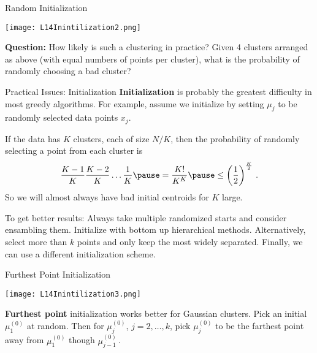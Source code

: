 \documentclass[10pt, table, dvipsnames,xcdraw,handout]{beamer}
\begin{document}
\begin{frame}[fragile]{Random Initialization}
  \begin{minipage}[t][0.5\textheight][t]{\textwidth}
	\centering \texttt{[image: L14Inintilization2.png]} 
  \end{minipage}
  \vfill
\begin{minipage}[t][0.5\textheight][t]{\textwidth}
\textbf{Question:} How likely is such a clustering in practice? Given 4 clusters arranged as above (with equal numbers of points per cluster), what is the probability of randomly choosing a bad cluster?
\end{minipage}
\end{frame}









\begin{frame}[fragile]{Practical Issues: Initialization}
\textbf{Initialization} is probably the greatest difficulty in most greedy algorithms. \pause For example, assume we initialize by setting $\mu_j$ to be randomly selected data points $x_j$. 

If the data has $K$ clusters, each of size $N/K$, then the probability of randomly selecting a point from each cluster is
$$
\frac{K-1}{K}\frac{K-2}{K}\ldots \frac{1}{K}\pause = \frac{K!}{K^K} \pause \leq \left( \frac12\right)^{\frac K2}\,.
$$\pause
So we will almost always have bad initial centroids for $K$ large. \pause

To get better results: Always take multiple randomized starts and consider ensambling them. Initialize with bottom up hierarchical methods. Alternatively, select more than $k$ points and only keep the most widely separated. Finally, we can use a different initialization scheme. 
\end{frame}







\begin{frame}[fragile]{Furthest Point Initialization}
  \begin{minipage}[t][0.5\textheight][t]{\textwidth}
	\centering \texttt{[image: L14Inintilization3.png]} 
  \end{minipage}
  \vfill
\begin{minipage}[t][0.5\textheight][t]{\textwidth}
\textbf{Furthest point} initialization works better for Gaussian clusters. Pick an initial $\mu^{(0)}_1$ at random. Then for $\mu^{(0)}_j$, $j=2,\ldots, k$, pick $\mu^{(0)}_j$ to be the farthest point away from $\mu^{(0)}_1$ though $\mu^{(0)}_{j-1}$\,.\pause
\end{minipage}
\end{frame}
\end{document}
